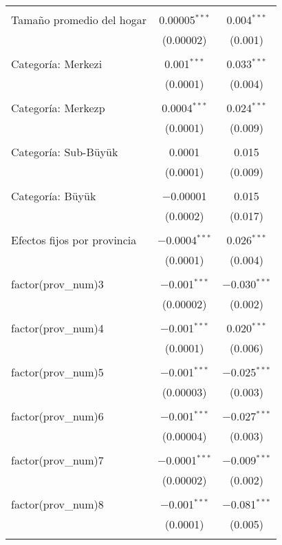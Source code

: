 \begin{table}[ht!]
\begin{tabular}{@{\extracolsep{5pt}}lcc}
  & & \\ 
 Tamaño promedio del hogar & 0.00005$^{***}$ & 0.004$^{***}$ \\ 
  & (0.00002) & (0.001) \\ 
  & & \\ 
 Categoría: Merkezi & 0.001$^{***}$ & 0.033$^{***}$ \\ 
  & (0.0001) & (0.004) \\ 
  & & \\ 
 Categoría: Merkezp & 0.0004$^{***}$ & 0.024$^{***}$ \\ 
  & (0.0001) & (0.009) \\ 
  & & \\ 
 Categoría: Sub-Büyük & 0.0001 & 0.015 \\ 
  & (0.0001) & (0.009) \\ 
  & & \\ 
 Categoría: Büyük & $-$0.00001 & 0.015 \\ 
  & (0.0002) & (0.017) \\ 
  & & \\ 
 Efectos fijos por provincia & $-$0.0004$^{***}$ & 0.026$^{***}$ \\ 
  & (0.0001) & (0.004) \\ 
  & & \\ 
 factor(prov\_num)3 & $-$0.001$^{***}$ & $-$0.030$^{***}$ \\ 
  & (0.00002) & (0.002) \\ 
  & & \\ 
 factor(prov\_num)4 & $-$0.001$^{***}$ & 0.020$^{***}$ \\ 
  & (0.0001) & (0.006) \\ 
  & & \\ 
 factor(prov\_num)5 & $-$0.001$^{***}$ & $-$0.025$^{***}$ \\ 
  & (0.00003) & (0.003) \\ 
  & & \\ 
 factor(prov\_num)6 & $-$0.001$^{***}$ & $-$0.027$^{***}$ \\ 
  & (0.00004) & (0.003) \\ 
  & & \\ 
 factor(prov\_num)7 & $-$0.0001$^{***}$ & $-$0.009$^{***}$ \\ 
  & (0.00002) & (0.002) \\ 
  & & \\ 
 factor(prov\_num)8 & $-$0.001$^{***}$ & $-$0.081$^{***}$ \\ 
  & (0.0001) & (0.005) \\ 
  & & \\ 

\end{tabular}
\end{table}
